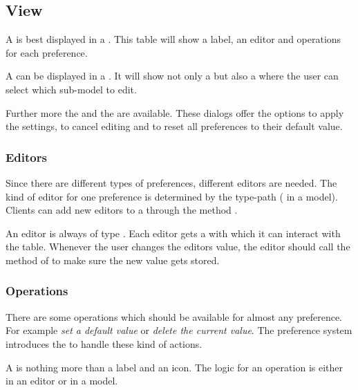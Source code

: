 
\subsection{View}
A  is best displayed in a . This table will show a label, an editor and operations for each preference. 

A  can be displayed in a . It will show not only a  but also a  where the user can select which sub-model to edit.

Further more the  and the  are available. These dialogs offer the options to apply the settings, to cancel editing and to reset all preferences to their default value.

\subsubsection{Editors}
Since there are different types of preferences, different editors are needed. The kind of editor for one preference is determined by the type-path ( in a model). Clients can add new editors to a  through the method .

An editor is always of type . Each editor gets a \linebreak {} with which it can interact with the table. Whenever the user changes the editors value, the editor should call the method  of  to make sure the new value gets stored.

\subsubsection{Operations}
There are some operations which should be available for almost any preference. For example \textit{set a default value} or \textit{delete the current value}. The preference system introduces the  to handle these kind of actions.

A  is nothing more than a label and an icon. The logic for an operation is either in an editor or in a model.

